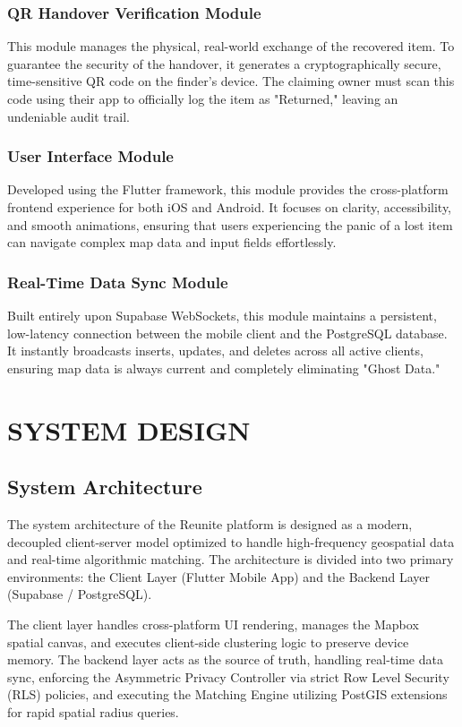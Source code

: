 \documentclass[12pt,a4paper]{report}
\begin{document}
\subsection{QR Handover Verification Module}
This module manages the physical, real-world exchange of the recovered item. To guarantee the security of the handover, it generates a cryptographically secure, time-sensitive QR code on the finder's device. The claiming owner must scan this code using their app to officially log the item as "Returned," leaving an undeniable audit trail.

\subsection{User Interface Module}
Developed using the Flutter framework, this module provides the cross-platform frontend experience for both iOS and Android. It focuses on clarity, accessibility, and smooth animations, ensuring that users experiencing the panic of a lost item can navigate complex map data and input fields effortlessly.

\subsection{Real-Time Data Sync Module}
Built entirely upon Supabase WebSockets, this module maintains a persistent, low-latency connection between the mobile client and the PostgreSQL database. It instantly broadcasts inserts, updates, and deletes across all active clients, ensuring map data is always current and completely eliminating "Ghost Data."

\chapter{SYSTEM DESIGN}

\section{System Architecture}
The system architecture of the Reunite platform is designed as a modern, decoupled client-server model optimized to handle high-frequency geospatial data and real-time algorithmic matching. The architecture is divided into two primary environments: the Client Layer (Flutter Mobile App) and the Backend Layer (Supabase / PostgreSQL). 

The client layer handles cross-platform UI rendering, manages the Mapbox spatial canvas, and executes client-side clustering logic to preserve device memory. The backend layer acts as the source of truth, handling real-time data sync, enforcing the Asymmetric Privacy Controller via strict Row Level Security (RLS) policies, and executing the Matching Engine utilizing PostGIS extensions for rapid spatial radius queries.
\end{document}
